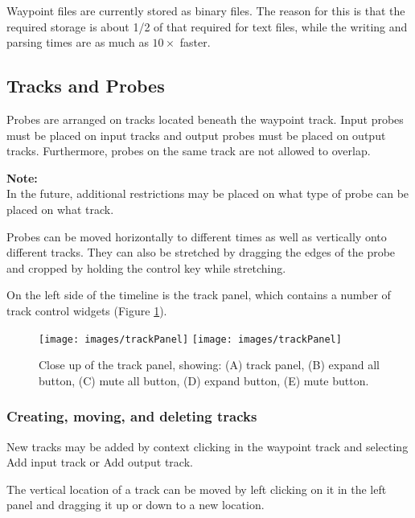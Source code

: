 \documentclass{article}
\begin{document}
\begin{sideblock}
Waypoint files are currently stored as binary files. The reason for
this is that the required storage is about 1/2 of that required for
text files, while the writing and parsing times are as much as
$10 \times$ faster.
\end{sideblock}

\subsection{Tracks and Probes}

Probes are arranged on tracks located beneath the waypoint track.  Input
probes must be placed on input tracks and output probes must be placed
on output tracks.  Furthermore, probes on the same track are not allowed
to overlap.

\begin{sideblock}
{\bf Note:}\\
In the future, additional restrictions may be placed on
what type of probe can be placed on what track.
\end{sideblock}

Probes can be moved horizontally to different times as well as vertically
onto different tracks.  They can also be stretched by dragging the edges
of the probe and cropped by holding the control key while stretching.

On the left side of the timeline is the track panel, which
contains a number of track control widgets (Figure \ref{trackPanelFig}).

\begin{figure}
\begin{center}
\iflatexml
\texttt{[image: images/trackPanel]}
\else
\texttt{[image: images/trackPanel]}
\fi
\end{center}
\caption{Close up of the track panel, showing: (A) track panel, (B)
expand all button, (C) mute all button, (D) expand button, (E) mute
button.}%
\label{trackPanelFig}
\end{figure}

\subsubsection{Creating, moving, and deleting tracks}

New tracks may be added by context clicking in the waypoint track and
selecting {\sf Add input track} or {\sf Add output track}. 

The vertical location of a track can be moved by left clicking on it
in the left panel and dragging it up or down to a new location.
\end{document}
